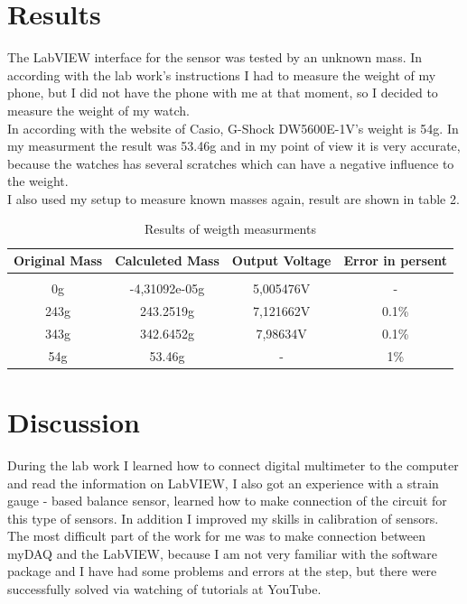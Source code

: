 \documentclass[english]{article}
\begin{document}
\section{Results}

The LabVIEW interface for the sensor was tested by an unknown mass. In according with the lab work's instructions I had to measure the weight of my phone, but I did not have the phone with me at that moment, so I decided to measure the weight of my watch.\\

In according with the website of Casio, G-Shock DW5600E-1V's weight is 54g. In my measurment the result was 53.46g and in my point of view it is very accurate, because the watches has several scratches which can have a negative influence to the weight.\\

I also used my setup to measure known masses again, result are shown in table 2.

\begin{table}[H]
  \caption{Results of weigth measurments}
    \begin{center}
      \begin{tabular}{ c c c c }

        Original Mass & Calculeted Mass & Output Voltage & Error in persent \\
        \hline\\
        0g & -4,31092e-05g & 5,005476V & -\\
        243g & 243.2519g & 7,121662V & 0.1\%\\
        343g & 342.6452g & 7,98634V & 0.1\%\\
        54g & 53.46g & - & 1\%\\
      \end{tabular}
    \end{center}
  \end{table}


\section{Discussion}

During the lab work I learned how to connect digital multimeter to the computer and read the information on LabVIEW, I also got an experience with a strain gauge - based balance sensor, learned how to make connection of the circuit for this type of sensors. In addition I improved my skills in calibration of sensors. The most difficult part of the work for me was to make connection between myDAQ and the LabVIEW, because I am not very familiar with the software package and I have had some problems and errors at the step, but there were successfully solved via watching of tutorials at YouTube.\\
\end{document}

